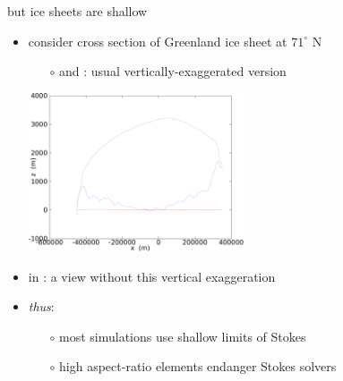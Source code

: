 \documentclass{beamer}
\begin{document}
\begin{frame}{but ice sheets are shallow}

\begin{itemize}
\item consider cross section of Greenland ice sheet at $71^\circ$ N
\small
  \begin{itemize}
  \item[$\circ$] {\color{dark green}{green}} and {\color{dark blue}{blue}}: usual vertically-exaggerated version
  \end{itemize}
  \begin{center}
    \includegraphics[width=0.5\textwidth]{greentrans}
  \end{center}
\normalsize
\item in {\color{dark red}{red}}: a view without this vertical exaggeration
\item \emph{thus}: 
  \begin{itemize}
  \item[$\circ$] most simulations use shallow limits of Stokes
  \item[$\circ$] high aspect-ratio elements endanger Stokes solvers
  \end{itemize}
\end{itemize}
\end{frame}
\end{document}
